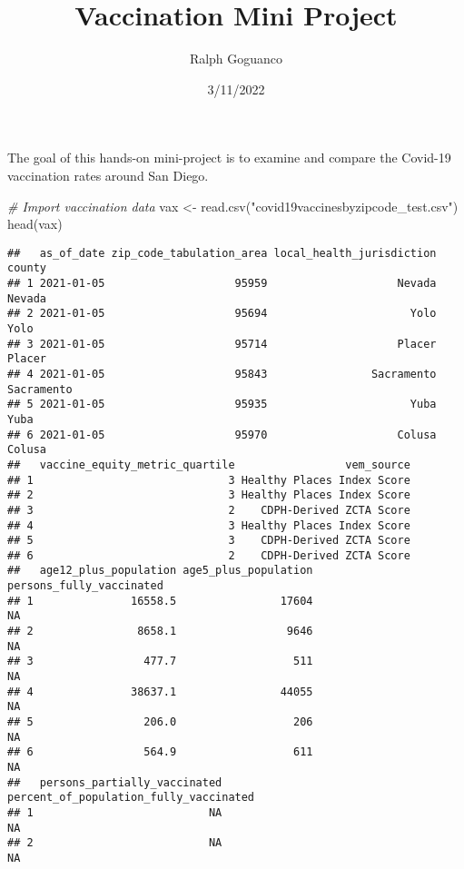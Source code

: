 \documentclass[
]{article}
\title{Vaccination Mini Project}
\author{Ralph Goguanco}
\date{3/11/2022}
\newenvironment{Shaded}{\begin{snugshade}}{\end{snugshade}}
\newcommand{\CommentTok}[1]{\textcolor[rgb]{0.56,0.35,0.01}{\textit{#1}}}
\newcommand{\FunctionTok}[1]{\textcolor[rgb]{0.00,0.00,0.00}{#1}}
\newcommand{\NormalTok}[1]{#1}
\newcommand{\OtherTok}[1]{\textcolor[rgb]{0.56,0.35,0.01}{#1}}
\newcommand{\StringTok}[1]{\textcolor[rgb]{0.31,0.60,0.02}{#1}}
\begin{document}
\maketitle

The goal of this hands-on mini-project is to examine and compare the
Covid-19 vaccination rates around San Diego.

\begin{Shaded}
\begin{Highlighting}[]
\CommentTok{\# Import vaccination data}
\NormalTok{vax }\OtherTok{\textless{}{-}} \FunctionTok{read.csv}\NormalTok{(}\StringTok{"covid19vaccinesbyzipcode\_test.csv"}\NormalTok{)}
\FunctionTok{head}\NormalTok{(vax)}
\end{Highlighting}
\end{Shaded}

\begin{verbatim}
##   as_of_date zip_code_tabulation_area local_health_jurisdiction     county
## 1 2021-01-05                    95959                    Nevada     Nevada
## 2 2021-01-05                    95694                      Yolo       Yolo
## 3 2021-01-05                    95714                    Placer     Placer
## 4 2021-01-05                    95843                Sacramento Sacramento
## 5 2021-01-05                    95935                      Yuba       Yuba
## 6 2021-01-05                    95970                    Colusa     Colusa
##   vaccine_equity_metric_quartile                 vem_source
## 1                              3 Healthy Places Index Score
## 2                              3 Healthy Places Index Score
## 3                              2    CDPH-Derived ZCTA Score
## 4                              3 Healthy Places Index Score
## 5                              3    CDPH-Derived ZCTA Score
## 6                              2    CDPH-Derived ZCTA Score
##   age12_plus_population age5_plus_population persons_fully_vaccinated
## 1               16558.5                17604                       NA
## 2                8658.1                 9646                       NA
## 3                 477.7                  511                       NA
## 4               38637.1                44055                       NA
## 5                 206.0                  206                       NA
## 6                 564.9                  611                       NA
##   persons_partially_vaccinated percent_of_population_fully_vaccinated
## 1                           NA                                     NA
## 2                           NA                                     NA

\end{verbatim}
\end{document}
